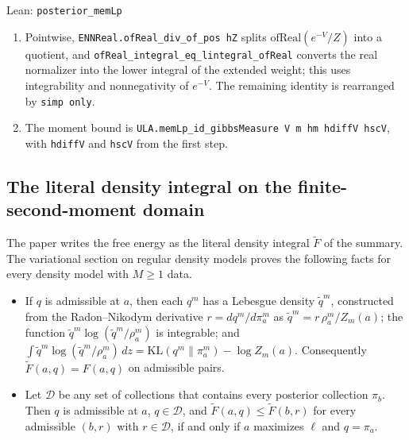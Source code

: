 \documentclass[11pt,a4paper]{report}
\begin{document}
\begin{leanbox}{Lean: \texttt{posterior\_\allowbreak{}memLp}}
\begin{enumerate}
\item Pointwise, \texttt{ENNReal.\allowbreak{}of\allowbreak{}Real\_\allowbreak{}div\_\allowbreak{}of\_\allowbreak{}pos h\allowbreak{}Z} splits \(\mathrm{ofReal}(e^{-V}/Z)\) into a quotient, and \texttt{of\allowbreak{}Real\_\allowbreak{}integral\_\allowbreak{}eq\_\allowbreak{}lintegral\_\allowbreak{}of\allowbreak{}Real} converts the real normalizer into the lower integral of the extended weight; this uses integrability and nonnegativity of \(e^{-V}\). The remaining identity is rearranged by \texttt{simp only}.

\item The moment bound is \texttt{ULA.\allowbreak{}mem\allowbreak{}Lp\_\allowbreak{}id\_\allowbreak{}gibbs\allowbreak{}Measure V m hm hdiff\allowbreak{}V hsc\allowbreak{}V}, with \texttt{hdiff\allowbreak{}V} and \texttt{hsc\allowbreak{}V} from the first step.

\end{enumerate}
\end{leanbox}
\subsection{\texorpdfstring{The literal density integral on the finite-second-moment domain}{The literal density integral on the finite-second-moment domain}}


The paper writes the free energy as the literal density integral \(\widetilde F\) of the summary. The variational section on regular density models proves the following facts for every density model with \(M\ge1\) data.



\begin{itemize}


\item If \(q\) is admissible at \(a\), then each \(q^m\) has a Lebesgue density \(\tilde q^m\), constructed from the Radon–Nikodym derivative \(r=dq^m/d\pi_a^m\) as \(\tilde q^m=r\,\rho_a^m/Z_m(a)\); the function \(\tilde q^m\log(\tilde q^m/\rho_a^m)\) is integrable; and \(\int\tilde q^m\log(\tilde q^m/\rho_a^m)\,dz=\mathrm{KL}(q^m\|\pi_a^m)-\log Z_m(a)\). Consequently \(\widetilde F(a,q)=F(a,q)\) on admissible pairs.

\item Let \(\mathcal D\) be any set of collections that contains every posterior collection \(\pi_b\). Then \(q\) is admissible at \(a\), \(q\in\mathcal D\), and \(\widetilde F(a,q)\le\widetilde F(b,r)\) for every admissible \((b,r)\) with \(r\in\mathcal D\), if and only if \(a\) maximizes \(\ell\) and \(q=\pi_a\).

\end{itemize}
\end{document}

